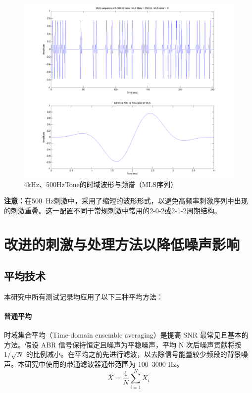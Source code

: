 \begin{figure}[H]
    \begin{minipage}{0.48\textwidth}
        \includegraphics[width=\textwidth]{images/msl_sequence_with500Hztone.png}
    \end{minipage}
    \hfill
    \begin{minipage}{0.48\textwidth}
        \includegraphics[width=\textwidth]{images/individual500HzToneInMLS.png}
    \end{minipage}
    \caption{4kHz、500HzTone的时域波形与频谱（MLS序列）}
    \label{fig:4k500hzToneAndNarrowbandChirp}
\end{figure}

\noindent \textbf{注意：}在500~Hz刺激中，采用了缩短的波形形式，以避免高频率刺激序列中出现的刺激重叠。这一配置不同于常规刺激中常用的2-0-2或2-1-2周期结构。


\section{改进的刺激与处理方法以降低噪声影响}
\subsection*{平均技术}

本研究中所有测试记录均应用了以下三种平均方法：
\paragraph*{普通平均}
时域集合平均（Time-domain ensemble averaging）是提高 SNR 最常见且基本的方法。假设 ABR 信号保持恒定且噪声为平稳噪声，平均 N 次后噪声贡献将按 $1/\sqrt{N}$ 的比例减小。在平均之前先进行滤波，以去除信号能量较少频段的背景噪声。本研究中使用的带通滤波器通带范围为 100–3000 Hz。
\[
\overline{X} = \frac{1}{N} \sum_{i=1}^{N} X_i
\]
